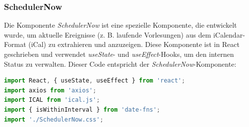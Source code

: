 \subsubsection{SchedulerNow}
Die Komponente \emph{SchedulerNow} ist eine spezielle Komponente, die entwickelt wurde, um  aktuelle Ereignisse (z. B. laufende Vorlesungen) aus dem iCalendar-Format (iCal) zu extrahieren und anzuzeigen. Diese Komponente ist in React geschrieben und verwendet \emph{useState}- und \emph{useEffect}-Hooks, um den internen Status zu verwalten. Dieser Code entspricht der \emph{SchedulerNow}-Komponente:

\begin{lstlisting}[language=JavaScript,
	frame=single,           % Ein Rahmen um den Code
	framexleftmargin=15pt,  % Rahmen link von den Zahlen
	style=algoBericht,
	label={SchedulerNow-Komponente},
	captionpos=b ,          % Caption unter den Code setzen
	caption={SchedulerNow-Komponente}]
import React, { useState, useEffect } from 'react';
import axios from 'axios';
import ICAL from 'ical.js';
import { isWithinInterval } from 'date-fns';
import './SchedulerNow.css';


\end{lstlisting}
